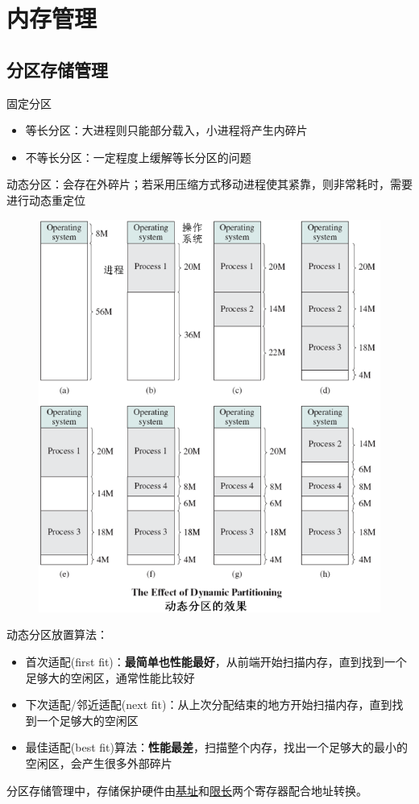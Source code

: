 
\section{内存管理}
\subsection{分区存储管理}
固定分区
\begin{itemize}
    \item 等长分区：大进程则只能部分载入，小进程将产生内碎片
    \item 不等长分区：一定程度上缓解等长分区的问题
\end{itemize}

动态分区：会存在外碎片；若采用压缩方式移动进程使其紧靠，则非常耗时，需要进行动态重定位
\begin{figure}[H]
    \centering
    \includegraphics[width=0.6\linewidth]{fig/dynamic_partition.png}
\end{figure}

动态分区放置算法：
\begin{itemize}
    \item 首次适配(first fit)：\textbf{最简单也性能最好}，从前端开始扫描内存，直到找到一个足够大的空闲区，通常性能比较好
    \item 下次适配/邻近适配(next fit)：从上次分配结束的地方开始扫描内存，直到找到一个足够大的空闲区
    \item 最佳适配(best fit)算法：\textbf{性能最差}，扫描整个内存，找出一个足够大的最小的空闲区，会产生很多外部碎片
\end{itemize}

分区存储管理中，存储保护硬件由\underline{基址}和\underline{限长}两个寄存器配合地址转换。

